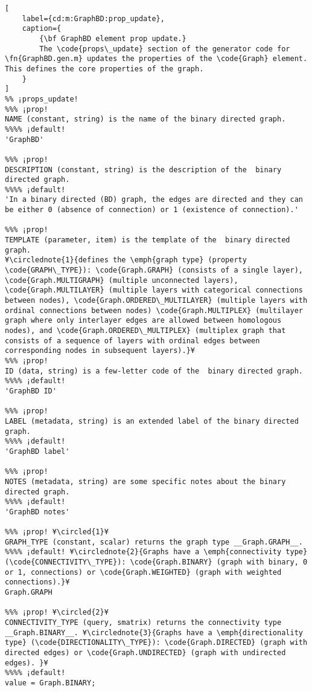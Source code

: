 \documentclass{tufte-handout}
\begin{document}
\begin{lstlisting}[
	label={cd:m:GraphBD:prop_update},
	caption={
		{\bf GraphBD element prop update.}
		The \code{props\_update} section of the generator code for \fn{GraphBD.gen.m} updates the properties of the \code{Graph} element. This defines the core properties of the graph.
	}
]
%% ¡props_update!
%%% ¡prop!
NAME (constant, string) is the name of the binary directed graph.
%%%% ¡default!
'GraphBD'

%%% ¡prop!
DESCRIPTION (constant, string) is the description of the  binary directed graph.
%%%% ¡default!
'In a binary directed (BD) graph, the edges are directed and they can be either 0 (absence of connection) or 1 (existence of connection).'

%%% ¡prop!
TEMPLATE (parameter, item) is the template of the  binary directed graph.
¥\circlednote{1}{defines the \emph{graph type} (property \code{GRAPH\_TYPE}): \code{Graph.GRAPH} (consists of a single layer), \code{Graph.MULTIGRAPH} (multiple unconnected layers), \code{Graph.MULTILAYER} (multiple layers with categorical connections between nodes), \code{Graph.ORDERED\_MULTILAYER} (multiple layers with ordinal connections between nodes) \code{Graph.MULTIPLEX} (multilayer graph where only interlayer edges are allowed between homologous nodes), and \code{Graph.ORDERED\_MULTIPLEX} (multiplex graph that consists of a sequence of layers with ordinal edges between corresponding nodes in subsequent layers).}¥
%%% ¡prop!
ID (data, string) is a few-letter code of the  binary directed graph.
%%%% ¡default!
'GraphBD ID'

%%% ¡prop!
LABEL (metadata, string) is an extended label of the binary directed graph.
%%%% ¡default!
'GraphBD label'

%%% ¡prop!
NOTES (metadata, string) are some specific notes about the binary directed graph.
%%%% ¡default!
'GraphBD notes'

%%% ¡prop! ¥\circled{1}¥
GRAPH_TYPE (constant, scalar) returns the graph type __Graph.GRAPH__.
%%%% ¡default! ¥\circlednote{2}{Graphs have a \emph{connectivity type} (\code{CONNECTIVITY\_TYPE}): \code{Graph.BINARY} (graph with binary, 0 or 1, connections) or \code{Graph.WEIGHTED} (graph with weighted connections).}¥
Graph.GRAPH

%%% ¡prop! ¥\circled{2}¥
CONNECTIVITY_TYPE (query, smatrix) returns the connectivity type __Graph.BINARY__. ¥\circlednote{3}{Graphs have a \emph{directionality type} (\code{DIRECTIONALITY\_TYPE}): \code{Graph.DIRECTED} (graph with directed edges) or \code{Graph.UNDIRECTED} (graph with undirected edges). }¥
%%%% ¡default!
value = Graph.BINARY;


\end{lstlisting}
\end{document}
